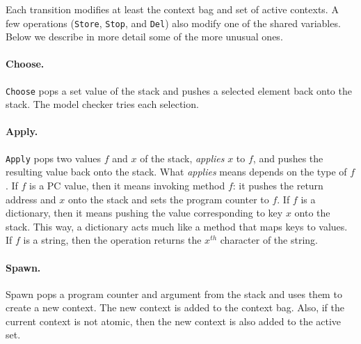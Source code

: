 \documentclass[twocolumn]{article}
\begin{document}
Each transition modifies at least the context bag and set of active
contexts.
A few operations (\texttt{Store}, \texttt{Stop}, and \texttt{Del})
also modify one of the shared variables.
Below we describe in more detail some of the more unusual ones.

\paragraph{Choose.} \texttt{Choose} pops a set value of the stack
and pushes a selected element back onto the stack.  The model checker
tries each selection.

\paragraph{Apply.}  \texttt{Apply} pops two values $f$ and $x$ of the stack,
\emph{applies} $x$ to $f$, and pushes the resulting value back onto the
stack.  What \emph{applies} means depends on the type of $f$.  If $f$ is
a PC value, then it means invoking method $f$: it pushes the return address
and $x$ onto the stack and sets the program counter to $f$.  If $f$ is a
dictionary, then it means pushing the value corresponding to key $x$ onto
the stack.  This way, a dictionary acts much like a method that maps keys
to values.  If $f$ is a string, then the operation returns the $x^{th}$
character of the string.

\paragraph{Spawn.}  Spawn pops a program counter and argument from the
stack and uses them to create a new context.  The new context is added
to the context bag.  Also, if the current context is not atomic, then
the new context is also added to the active set.
\end{document}
